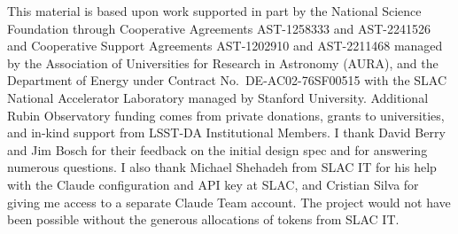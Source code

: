 \documentclass[11pt,twoside]{article}
\begin{document}
\acknowledgments This material is based upon work supported in part by the National Science Foundation through Cooperative Agreements AST-1258333 and AST-2241526 and Cooperative Support Agreements AST-1202910 and AST-2211468 managed by the Association of Universities for Research in Astronomy (AURA), and the Department of Energy under Contract No.\ DE-AC02-76SF00515 with the SLAC National Accelerator Laboratory managed by Stanford University.
Additional Rubin Observatory funding comes from private donations, grants to universities, and in-kind support from LSST-DA Institutional Members.
I thank David Berry and Jim Bosch for their feedback on the initial design spec and for answering numerous questions.
I also thank Michael Shehadeh from SLAC IT for his help with the Claude configuration and API key at SLAC, and Cristian Silva for giving me access to a separate Claude Team account.
The project would not have been possible without the generous allocations of tokens from SLAC IT.


\end{document}
